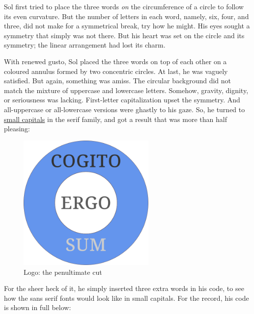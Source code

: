 \documentclass[
  11pt,
  british,
  a4paper,
]{article}
\makeatletter
\newcounter{figno}
\newenvironment{fignos:no-prefix-figure-caption}{
      \caption@ifcompatibility{}{
        \let\oldthefigure\thefigure
        \let\oldtheHfigure\theHfigure
        \renewcommand{\thefigure}{figno:\thefigno}
        \renewcommand{\theHfigure}{figno:\thefigno}
        \stepcounter{figno}
        \captionsetup{labelformat=empty}
      }
    }{
      \caption@ifcompatibility{}{
        \captionsetup{labelformat=default}
        \let\thefigure\oldthefigure
        \let\theHfigure\oldtheHfigure
        \addtocounter{figure}{-1}
      }
    }
\makeatother
\begin{document}
Sol first tried to place the three words \emph{on} the circumference of
a circle to follow its even curvature. But the number of letters in each
word, namely, six, four, and three, did not make for a symmetrical
break, try how he might. His eyes sought a symmetry that simply was not
there. But his heart was set on the circle and its symmetry; the linear
arrangement had lost its charm.

With renewed gusto, Sol placed the three words on top of each other on a
coloured annulus formed by two concentric circles. At last, he was
vaguely satisfied. But again, something was amiss. The circular
background did not match the mixture of uppercase and lowercase letters.
Somehow, gravity, dignity, or seriousness was lacking. First-letter
capitalization upset the symmetry. And all-uppercase or all-lowercase
versions were ghastly to his gaze. So, he turned to
\href{https://en.wikipedia.org/wiki/Small_caps}{small capitals} in the
serif family, and got a result that was more than half pleasing:

\begin{fignos:no-prefix-figure-caption}

\begin{figure}
\centering
\includegraphics[width=0.6\textwidth,height=\textheight]{images/penultimatecut.svg}
\caption{Logo: the penultimate cut}
\end{figure}

\end{fignos:no-prefix-figure-caption}

For the sheer heck of it, he simply inserted three extra words in his
code, to see how the sans serif fonts would look like in small capitals.
For the record, his code is shown in full below:
\end{document}

